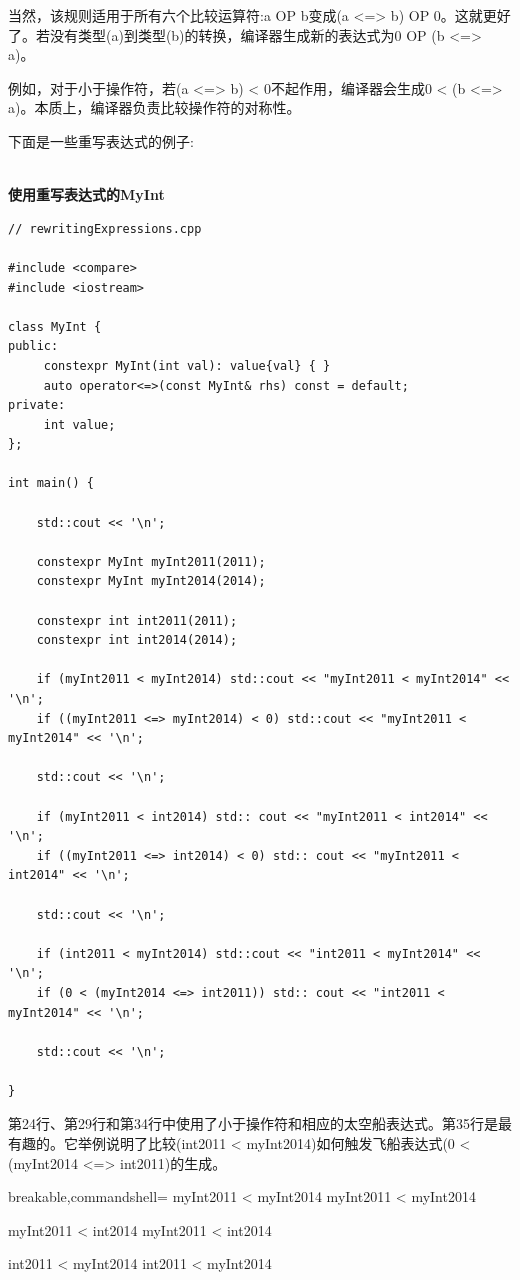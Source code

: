 当然，该规则适用于所有六个比较运算符:a OP b变成(a <=> b) OP 0。这就更好了。若没有类型(a)到类型(b)的转换，编译器生成新的表达式为0 OP (b <=> a)。

例如，对于小于操作符，若(a <=> b) < 0不起作用，编译器会生成0 < (b <=> a)。本质上，编译器负责比较操作符的对称性。

下面是一些重写表达式的例子:

\hspace*{\fill} \\ %
\noindent
\textbf{使用重写表达式的MyInt}
\begin{lstlisting}[style=styleCXX]
// rewritingExpressions.cpp

#include <compare>
#include <iostream>

class MyInt {
public:
	 constexpr MyInt(int val): value{val} { }
	 auto operator<=>(const MyInt& rhs) const = default;
private:
	 int value;
};

int main() {
	
	std::cout << '\n';
	
	constexpr MyInt myInt2011(2011);
	constexpr MyInt myInt2014(2014);
	
	constexpr int int2011(2011);
	constexpr int int2014(2014);
	
	if (myInt2011 < myInt2014) std::cout << "myInt2011 < myInt2014" << '\n';
	if ((myInt2011 <=> myInt2014) < 0) std::cout << "myInt2011 < myInt2014" << '\n';
	
	std::cout << '\n';
	
	if (myInt2011 < int2014) std:: cout << "myInt2011 < int2014" << '\n';
	if ((myInt2011 <=> int2014) < 0) std:: cout << "myInt2011 < int2014" << '\n';
	
	std::cout << '\n';
	
	if (int2011 < myInt2014) std::cout << "int2011 < myInt2014" << '\n';
	if (0 < (myInt2014 <=> int2011)) std:: cout << "int2011 < myInt2014" << '\n';
	
	std::cout << '\n';

}
\end{lstlisting}

第24行、第29行和第34行中使用了小于操作符和相应的太空船表达式。第35行是最有趣的。它举例说明了比较(int2011 < myInt2014)如何触发飞船表达式(0 < (myInt2014 <=> int2011)的生成。

\begin{tcblisting}{breakable,commandshell={}}
myInt2011 < myInt2014
myInt2011 < myInt2014

myInt2011 < int2014
myInt2011 < int2014

int2011 < myInt2014
int2011 < myInt2014
\end{tcblisting}

